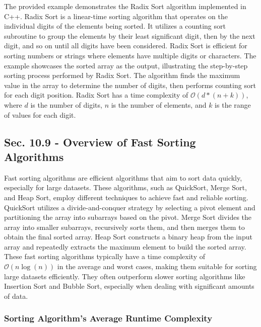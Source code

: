 \begin{solution}
    The provided example demonstrates the Radix Sort algorithm implemented in C++. Radix Sort is a linear-time sorting algorithm that operates on the individual digits of the elements being sorted. It utilizes a counting sort subroutine to group the elements by their least significant digit, then by the next digit, and so on until all digits have
    been considered. Radix Sort is efficient for sorting numbers or strings where elements have multiple digits or characters. The example showcases the sorted array as the output, illustrating the step-by-step sorting process performed by Radix Sort. The algorithm finds the maximum value in the array to determine the number of digits, then performs
    counting sort for each digit position. Radix Sort has a time complexity of $\mathcal{O}(d*(n+k))$, where $d$ is the number of digits, $n$ is the number of elements, and $k$ is the range of values for each digit.
\end{solution}

\subsection*{Sec. 10.9 - Overview of Fast Sorting Algorithms}

Fast sorting algorithms are efficient algorithms that aim to sort data quickly, especially for large datasets. These algorithms, such as QuickSort, Merge Sort, and Heap Sort, employ different techniques to achieve fast and reliable sorting. QuickSort utilizes a divide-and-conquer strategy by selecting a pivot element and partitioning the array into 
subarrays based on the pivot. Merge Sort divides the array into smaller subarrays, recursively sorts them, and then merges them to obtain the final sorted array. Heap Sort constructs a binary heap from the input array and repeatedly extracts the maximum element to build the sorted array. These fast sorting algorithms typically have a time complexity of 
$\mathcal{O}(n\log{(n)})$ in the average and worst cases, making them suitable for sorting large datasets efficiently. They often outperform slower sorting algorithms like Insertion Sort and Bubble Sort, especially when dealing with significant amounts of data.

\subsubsection{Sorting Algorithm's Average Runtime Complexity}

